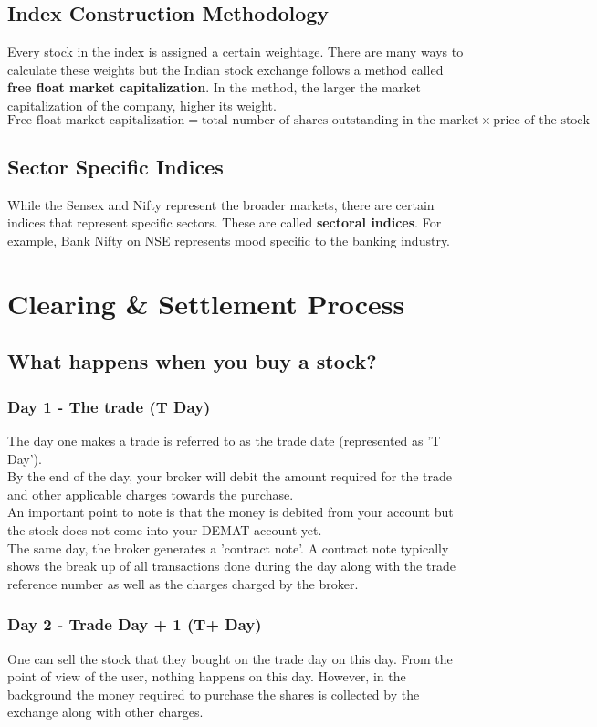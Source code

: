 \subsection{Index Construction Methodology}
Every stock in the index is assigned a certain weightage. There are many ways to calculate these weights but the Indian stock exchange follows a method called \textbf{free float market capitalization}. In the method, the larger the market capitalization of the company, higher its weight.
\[ \textrm{Free float market capitalization} = \textrm{total number of shares outstanding in the market} \times \textrm{price of the stock} \]

\subsection{Sector Specific Indices}
While the Sensex and Nifty represent the broader markets, there are certain indices that represent specific sectors. These are called \textbf{sectoral indices}. For example, Bank Nifty on NSE represents mood specific to the banking industry.

\section{Clearing \& Settlement Process}

\subsection{What happens when you buy a stock?}
\subsubsection{Day 1 - The trade (T Day)}
The day one makes a trade is referred to as the trade date (represented as 'T Day').
\\
By the end of the day, your broker will debit the amount required for the trade and other applicable charges towards the purchase.
\\
An important point to note is that the money is debited from your account but the stock does not come into your DEMAT account yet.
\\
The same day, the broker generates a 'contract note'. A contract note typically shows the break up of all transactions done during the day along with the trade reference number as well as the charges charged by the broker.

\subsubsection{Day 2 - Trade Day + 1 (T+ Day)}
One can sell the stock that they bought on the trade day on this day.
\noindent From the point of view of the user, nothing happens on this day. However, in the background the money required to purchase the shares is collected by the exchange along with other charges.

